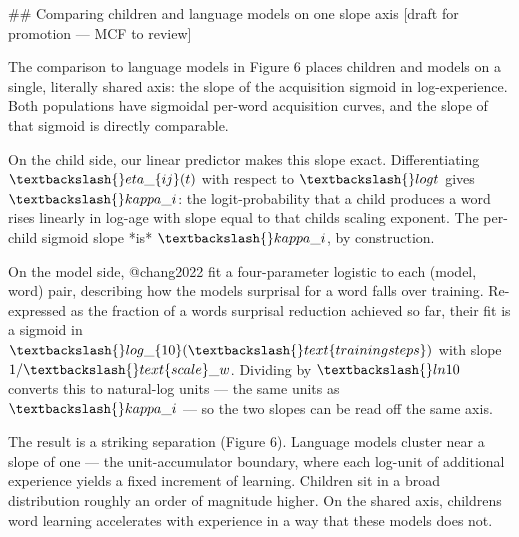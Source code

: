 \documentclass[
  11pt,
]{article}
\newenvironment{Shaded}{\begin{snugshade}}{\end{snugshade}}
\newcommand{\FunctionTok}[1]{\textcolor[rgb]{0.28,0.35,0.67}{#1}}
\newcommand{\NormalTok}[1]{\textcolor[rgb]{0.00,0.23,0.31}{#1}}
\begin{document}
\begin{Shaded}
\begin{Highlighting}[]
\FunctionTok{\#\# Comparing children and language models on one slope axis  [draft for promotion — MCF to review]}

\NormalTok{The comparison to language models in Figure 6 places children and models}
\NormalTok{on a single, literally shared axis: the slope of the acquisition sigmoid}
\NormalTok{in log{-}experience. Both populations have sigmoidal per{-}word acquisition}
\NormalTok{curves, and the slope of that sigmoid is directly comparable.}

\NormalTok{On the child side, our linear predictor makes this slope exact.}
\NormalTok{Differentiating $\textbackslash{}eta\_\{ij\}(t)$ with respect to $\textbackslash{}log t$ gives $\textbackslash{}kappa\_i$:}
\NormalTok{the logit{-}probability that a child produces a word rises linearly in}
\NormalTok{log{-}age with slope equal to that child\textquotesingle{}s scaling exponent. The per{-}child}
\NormalTok{sigmoid slope *is* $\textbackslash{}kappa\_i$, by construction.}

\NormalTok{On the model side, @chang2022 fit a four{-}parameter logistic to each}
\NormalTok{(model, word) pair, describing how the model\textquotesingle{}s surprisal for a word falls}
\NormalTok{over training. Re{-}expressed as the fraction of a word\textquotesingle{}s surprisal}
\NormalTok{reduction achieved so far, their fit is a sigmoid in}
\NormalTok{$\textbackslash{}log\_\{10\}(\textbackslash{}text\{training steps\})$ with slope $1/\textbackslash{}text\{scale\}\_w$.}
\NormalTok{Dividing by $\textbackslash{}ln 10$ converts this to natural{-}log units — the same units}
\NormalTok{as $\textbackslash{}kappa\_i$ — so the two slopes can be read off the same axis.}

\NormalTok{The result is a striking separation (Figure 6). Language models cluster}
\NormalTok{near a slope of one — the unit{-}accumulator boundary, where each log{-}unit}
\NormalTok{of additional experience yields a fixed increment of learning. Children}
\NormalTok{sit in a broad distribution roughly an order of magnitude higher. On the}
\NormalTok{shared axis, children\textquotesingle{}s word learning accelerates with experience in a way}
\NormalTok{that these models\textquotesingle{} does not.}


\end{Highlighting}
\end{Shaded}
\end{document}
